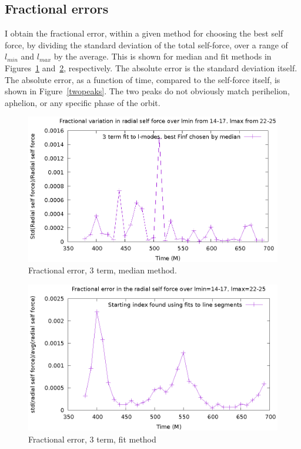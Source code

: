 \subsection{Fractional errors}


I obtain the fractional error, within a given method for choosing the best self force, by dividing the standard deviation of the total self-force, over a range of $l_{min}$ and $l_{max}$ by the average. This is shown for median and fit methods in Figures~\ref{medfracerr} and~\ref{fitfracerr}, respectively. The absolute error is the standard deviation itself. The absolute error, as a function of time, compared to the self-force itself, is shown in Figure~\ref{twopeaks}. The two peaks do not obviously match perihelion, aphelion, or any specific phase of the orbit. 


\begin{figure}
  \includegraphics{fractionalErrorSelfForceOverTime3termMedian}
  \caption{Fractional error, 3 term, median method.}
  \label{medfracerr}
\end{figure}

\begin{figure}
  \includegraphics{fractionalErrorOverTimeFits}
  \caption{Fractional error, 3 term, fit method}
  \label{fitfracerr}
\end{figure}


